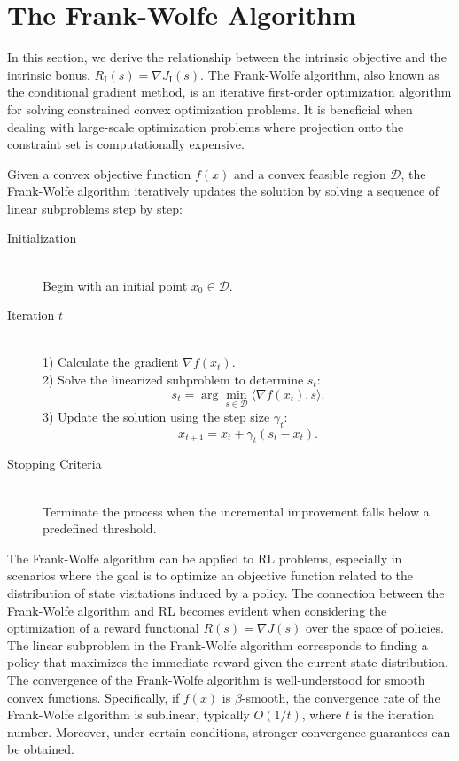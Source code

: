 \documentclass[letterpaper]{article} %
\begin{document}


\appendix
\section{The Frank-Wolfe Algorithm}
\label{sec:reference_examples}

In this section, we derive the relationship between the intrinsic objective and the intrinsic bonus, $R_\text{I}(s) = \nabla J_\text{I}(s)$.
The Frank-Wolfe algorithm, also known as the conditional gradient method, is an iterative first-order optimization algorithm for solving constrained convex optimization problems. It is beneficial when dealing with large-scale optimization problems where projection onto the constraint set is computationally expensive.

Given a convex objective function \( f(x) \) and a convex feasible region \( \mathcal{D} \), the Frank-Wolfe algorithm iteratively updates the solution by solving a sequence of linear subproblems step by step:
\begin{description}
    \item[Initialization]\hfill \\
    Begin with an initial point \( x_0 \in \mathcal{D} \).
    \item[Iteration \( t \)]\hfill \\
    1) Calculate the gradient \( \nabla f(x_t) \). \\
    2) Solve the linearized subproblem to determine \( s_t \):
    \[
    s_t = \arg \min_{s \in \mathcal{D}} \langle \nabla f(x_t), s \rangle.
    \]
    3) Update the solution using the step size \( \gamma_t \):
    \[
    x_{t+1} = x_t + \gamma_t (s_t - x_t).
    \]
    \item[Stopping Criteria]\hfill \\
    Terminate the process when the incremental improvement falls below a predefined threshold.
\end{description}

The Frank-Wolfe algorithm can be applied to RL problems, especially in scenarios where the goal is to optimize an objective function related to the distribution of state visitations induced by a policy. The connection between the Frank-Wolfe algorithm and RL becomes evident when considering the optimization of a reward functional \( R(s) = \nabla J(s) \) over the space of policies. The linear subproblem in the Frank-Wolfe algorithm corresponds to finding a policy that maximizes the immediate reward given the current state distribution. The convergence of the Frank-Wolfe algorithm is well-understood for smooth convex functions. Specifically, if \( f(x) \) is \( \beta \)-smooth, the convergence rate of the Frank-Wolfe algorithm is sublinear, typically \( O(1/t) \), where \( t \) is the iteration number. Moreover, under certain conditions, stronger convergence guarantees can be obtained.
\end{document}
